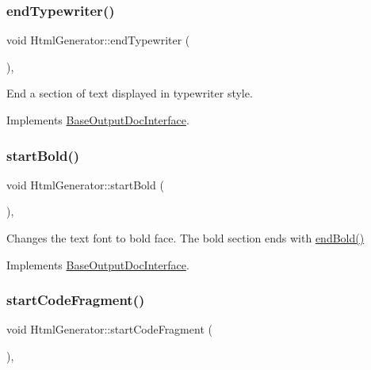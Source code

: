 \subsubsection{\texorpdfstring{endTypewriter()}{endTypewriter()}}
{\footnotesize\ttfamily void Html\+Generator\+::end\+Typewriter (\begin{DoxyParamCaption}{ }\end{DoxyParamCaption})\hspace{0.3cm}{\ttfamily [inline]}, {\ttfamily [virtual]}}

End a section of text displayed in typewriter style. 

Implements \mbox{\hyperlink{class_base_output_doc_interface_a9e987baf8aed76f0e5e6676b3238d2c8}{Base\+Output\+Doc\+Interface}}.

\mbox{\label{class_html_generator_a4785d0f1ac1828284aa1f21dbb1e3773}} 
\subsubsection{\texorpdfstring{startBold()}{startBold()}}
{\footnotesize\ttfamily void Html\+Generator\+::start\+Bold (\begin{DoxyParamCaption}{ }\end{DoxyParamCaption})\hspace{0.3cm}{\ttfamily [inline]}, {\ttfamily [virtual]}}

Changes the text font to bold face. The bold section ends with \mbox{\hyperlink{class_html_generator_a8e60c605c5db7577e2e0256c0431dcb1}{end\+Bold()}} 

Implements \mbox{\hyperlink{class_base_output_doc_interface_aa0bfe5ef08077a7191ba4666f47c441b}{Base\+Output\+Doc\+Interface}}.

\mbox{\label{class_html_generator_ac071e1f57eb6e4b2d4baeae1723186bd}} 
\subsubsection{\texorpdfstring{startCodeFragment()}{startCodeFragment()}}
{\footnotesize\ttfamily void Html\+Generator\+::start\+Code\+Fragment (\begin{DoxyParamCaption}{ }\end{DoxyParamCaption})\hspace{0.3cm}{\ttfamily [inline]}, {\ttfamily [virtual]}}

